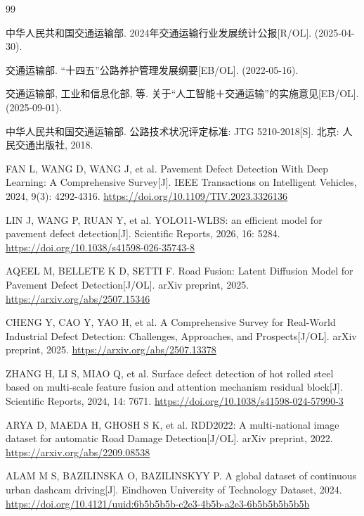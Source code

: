 \documentclass[UTF8, a4paper, fontset=ubuntu]{ctexart}
\begin{document}
\begin{thebibliography}{99}
 \setlength{\itemsep}{1pt}

 中华人民共和国交通运输部. 2024年交通运输行业发展统计公报[R/OL]. (2025-04-30). 

 交通运输部. “十四五”公路养护管理发展纲要[EB/OL]. (2022-05-16). 

 交通运输部, 工业和信息化部, 等. 关于“人工智能＋交通运输”的实施意见[EB/OL]. (2025-09-01). 

 中华人民共和国交通运输部. 公路技术状况评定标准: JTG 5210-2018[S]. 北京: 人民交通出版社, 2018.

 FAN L, WANG D, WANG J, et al. Pavement Defect Detection With Deep Learning: A Comprehensive Survey[J]. IEEE Transactions on Intelligent Vehicles, 2024, 9(3): 4292-4316. \url{https://doi.org/10.1109/TIV.2023.3326136}

 LIN J, WANG P, RUAN Y, et al. YOLO11-WLBS: an efficient model for pavement defect detection[J]. Scientific Reports, 2026, 16: 5284. \url{https://doi.org/10.1038/s41598-026-35743-8}

 AQEEL M, BELLETE K D, SETTI F. Road Fusion: Latent Diffusion Model for Pavement Defect Detection[J/OL]. arXiv preprint, 2025. \url{https://arxiv.org/abs/2507.15346}

 CHENG Y, CAO Y, YAO H, et al. A Comprehensive Survey for Real-World Industrial Defect Detection: Challenges, Approaches, and Prospects[J/OL]. arXiv preprint, 2025. \url{https://arxiv.org/abs/2507.13378}

 ZHANG H, LI S, MIAO Q, et al. Surface defect detection of hot rolled steel based on multi-scale feature fusion and attention mechanism residual block[J]. Scientific Reports, 2024, 14: 7671. \url{https://doi.org/10.1038/s41598-024-57990-3}

 ARYA D, MAEDA H, GHOSH S K, et al. RDD2022: A multi-national image dataset for automatic Road Damage Detection[J/OL]. arXiv preprint, 2022. \url{https://arxiv.org/abs/2209.08538}

 ALAM M S, BAZILINSKA O, BAZILINSKYY P. A global dataset of continuous urban dashcam driving[J]. Eindhoven University of Technology Dataset, 2024. \url{https://doi.org/10.4121/uuid:6b5b5b5b-c2e3-4b5b-a2e3-6b5b5b5b5b5b}


\end{thebibliography}
\end{document}
